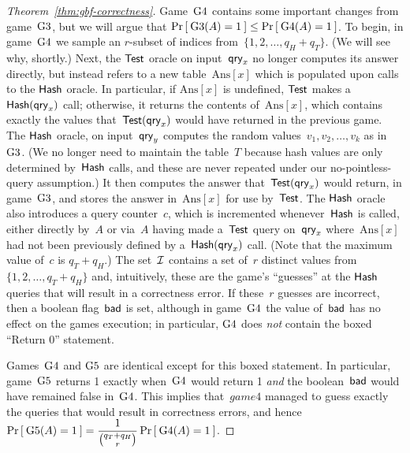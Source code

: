 \begin{proof}[Theorem~\ref{thm:gbf-correctness}]
Game~$\text{G4}$ contains some important changes from game~$\text{G3}$, but we will argue that $\Pr\left[\: \text{G3}(A) = 1 \:\right] \leq \Pr\left[\: \text{G4}(A) = 1 \:\right]$.  To begin, in game~$\text{G4}$ we sample an $r$-subset of indices from~$\{1,2,\ldots,q_H+q_T\}$.  (We will see why, shortly.)  Next, the $\mathsf{Test}$ oracle on input~$\mathsf{qry}_x$ no longer computes its answer directly, but instead refers to a new table~$\mathrm{Ans}[x]$ which is populated upon calls to the $\mathsf{Hash}$ oracle.  In particular, if $\mathrm{Ans}[x]$ is undefined, $\mathsf{Test}$ makes a $\mathsf{Hash}(\mathsf{qry}_x)$ call; otherwise, it returns the contents of~$\mathrm{Ans}[x]$, which contains exactly the values that~$\mathsf{Test}(\mathsf{qry}_x)$ would have returned in the previous game.  The $\mathsf{Hash}$ oracle, on input~$\mathsf{qry}_y$ computes the random values~$v_1,v_2,\ldots,v_k$ as in $\text{G3}$.  (We no longer need to maintain the table~$T$ because hash values are only determined by~$\mathsf{Hash}$ calls, and these are never repeated under our no-pointless-query assumption.)  It then computes the answer that~$\mathsf{Test}(\mathsf{qry}_x)$ would return, in game~$\text{G3}$, and stores the answer in~$\mathrm{Ans}[x]$ for use by~$\mathsf{Test}$.  The $\mathsf{Hash}$ oracle also introduces a query counter~$c$, which is incremented whenever~$\mathsf{Hash}$ is called, either directly by~$A$ or via~$A$ having made a~$\mathsf{Test}$ query on~$\mathsf{qry}_x$ where~$\mathrm{Ans}[x]$ had not been previously defined by a~$\mathsf{Hash}(\mathsf{qry}_x)$ call.    (Note that the maximum value of~$c$ is $q_T + q_H$.)  The set~${\cal I}$ contains a set of~$r$ distinct values from $\{1,2,\ldots,q_T+q_H\}$ and, intuitively, these are the game's ``guesses'' at the $\mathsf{Hash}$ queries that will result in a correctness error.  If these~$r$ guesses are incorrect, then a boolean flag~$\mathsf{bad}$ is set, although in game~$\text{G4}$ the value of~$\mathsf{bad}$ has no effect on the games execution; in particular, $\text{G4}$ does \emph{not} contain the boxed ``Return 0'' statement.

Games~$\text{G4}$ and $\text{G5}$ are identical except for this boxed statement.  In particular, game~$\text{G5}$ returns 1 exactly when~$\text{G4}$ would return 1 \emph{and} the boolean~$\mathsf{bad}$ would have remained false in~$\text{G4}$.   This implies that~$game{4}$ managed to guess exactly the queries that would result in correctness errors, and hence
$\Pr\left[\: \text{G5}(A)=1 \:\right] = \dfrac{1}{\binom{q_T + q_H}{r}}\Pr\left[\: \text{G4}(A)=1 \:\right]$.




\end{proof}
